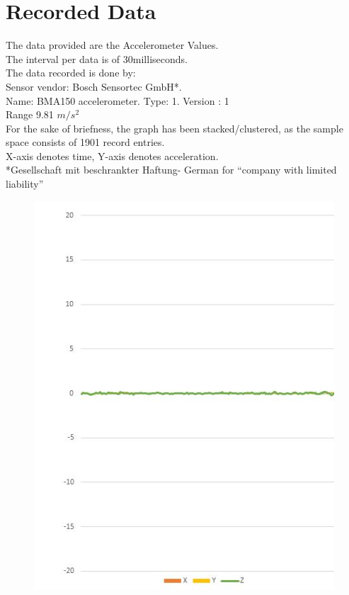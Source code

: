 \section{Recorded Data}
\label{sec:sec02}
{
The data provided are the Accelerometer Values.\\
The interval per data is of 30milliseconds. \\
The data recorded is done by: \\  
Sensor vendor: Bosch Sensortec GmbH*. \\
Name: BMA150 accelerometer. Type: 1. Version : 1\\ 
Range 9.81 $m/s^2$ \\
For the sake of briefness, the graph has been stacked/clustered, as the sample space consists of 1901 record entries.\\
X-axis denotes time, Y-axis denotes acceleration. \\
\vfill
*Gesellschaft mit beschrankter Haftung- German for ``company with limited liability''
\clearpage




\begin{figure}[!htb]
{	\centering
	\includegraphics[height=0.35\textheight]{fig01/g_stable}
	\label{fig:RHP01} \par\medskip
}




\end{figure}}
